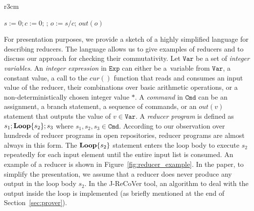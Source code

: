 \documentclass{llncs}
\newcommand{\Var}{\mathtt{Var}}
\newcommand{\Exp}{\mathtt{Exp}}
\newcommand{\Cmd}{\mathtt{Cmd}}
\newcommand{\cur}{cur()}
\newcommand{\rloop}{
	\ifmmode
	\mathbf{Loop}
	\else
	\textbf{Loop}
	\fi}
\begin{document}
\begin{wrapfigure}{r}{3cm}
		\vspace{-0.8cm}

	
	\begin{minipage}{0.3\textwidth}
		\begin{algorithm}[H]
			$s := 0;c:=0$; \;
			\Loop{}{
				$s := s+\cur$;\;
				$c := c+1$
			};
			$o := s/c$;\;
			$out(o)$\;
		\end{algorithm}
	\end{minipage}


	\caption{A reducer that computes the average value.}
	\vspace{-0.8cm}
	\label{fig:reducer_example}
\end{wrapfigure}

For presentation purposes, we provide a sketch of a highly simplified language
for describing reducers. The language allows us to give examples of reducers and
to discuss our approach for checking their commutativity. Let $\Var$ be a set of
\emph{integer variables}. An \emph{integer expression} in $\Exp$ can either be
a~variable from $\Var$, a constant value, a call to the $\cur$ function that
reads and consumes an input value of the reducer, their combinations over basic
arithmetic operations, or a non-deterministically chosen integer value $*$. A
\emph{command} in $\Cmd$ can be an assignment, a branch statement, a sequence of
commands, or an $out(v)$ statement that outputs the value of $v \in \Var$. A
\emph{reducer program} is defined as $s_1;\rloop\{s_2\};s_3$ where $s_1,s_2,s_3
\in \Cmd$. According to our observation over hundreds  of reducer programs in
open repositories, reducer programs are almost always in this form. The
$\rloop\{s_2\}$ statement enters the loop body to execute $s_2$ repeatedly for
each input element until the entire input list is consumed. An example of a
reducer is shown in Figure~\ref{fig:reducer_example}. In the paper, to simplify
the presentation, we assume that a reducer does never produce any output in the
loop body $s_2$. In the J-ReCoVer tool, an algorithm to deal with the output
inside the loop is implemented (as briefly mentioned at the end of
Section~\ref{sec:prover}).
\end{document}
